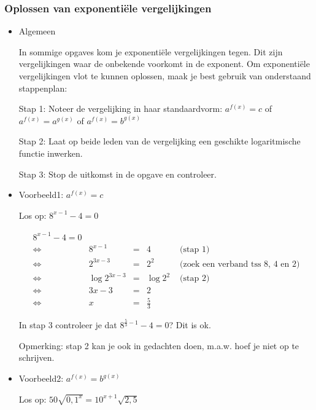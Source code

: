 \subsubsection{Oplossen van exponenti\"ele vergelijkingen}

\begin{itemize}
\item{Algemeen}

In sommige opgaves kom je exponenti\"ele vergelijkingen tegen. Dit zijn
vergelijkingen waar de onbekende voorkomt in de exponent. Om exponenti\"ele
vergelijkingen vlot te kunnen oplossen, maak je best gebruik van onderstaand
stappenplan:\medskip{}


Stap 1: Noteer de vergelijking in haar standaardvorm: ${\displaystyle a^{f(x)}=c}$
of ${\displaystyle a^{f(x)}=a^{g(x)}}$ of ${\displaystyle a^{f(x)}=b^{g(x)}}$ 

Stap 2: Laat op beide leden van de vergelijking een geschikte logaritmische
functie inwerken.

Stap 3: Stop de uitkomst in de opgave en controleer.


\item{Voorbeeld1: ${\displaystyle a^{f(x)}=c}$}

Los op: ${\displaystyle 8^{x-1}-4=0}$

\[
{\displaystyle \begin{split}8^{x-1}-4=0\\
	\Longleftrightarrow & 8^{x-1} & = & 4 & \text{ (stap 1)}\\
	\Longleftrightarrow & 2^{3x-3} & = & 2^{2} & \text{ (zoek een verband tss 8, 4 en 2)}\\
	\Longleftrightarrow & \log2^{3x-3} & = & \log2^{2} & \text{ (stap 2)}\\
	\Longleftrightarrow & 3x-3 & = & 2 & \text{}\\
	\Longleftrightarrow & x & = & \frac{5}{3}
	\end{split}
}
\]


In stap 3 controleer je dat ${\displaystyle 8^{\frac{5}{3}-1}-4=0}$?
Dit is ok.

Opmerking: stap 2 kan je ook in gedachten doen, m.a.w. hoef je niet
op te schrijven.


\item{Voorbeeld2: ${\displaystyle a^{f(x)}=b^{g(x)}}$ }

Los op: ${\displaystyle 50\sqrt{0,1^{x}}=10^{x+1}\sqrt{2,5}}$


\end{itemize}

